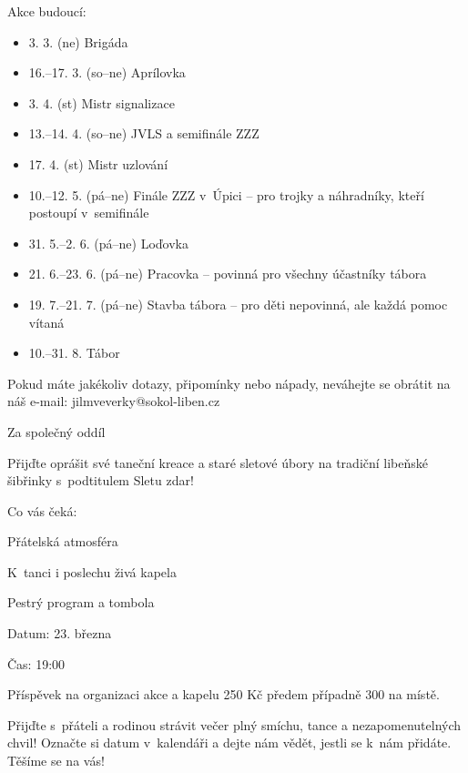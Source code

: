 \documentclass[11pt]{article}
\begin{document}
\clearpage
\vspace*{6pt}
\noindent
Akce budoucí:
\begin{itemize}[
  itemsep=-3pt,
  leftmargin=2em,
  itemindent=-1em
]
  \item[] 3. 3. (ne) Brigáda
  \item[] 16.–17. 3. (so–ne) Aprílovka
  \item[] 3. 4. (st) Mistr signalizace
  \item[] 13.–14. 4. (so–ne) JVLS a semifinále ZZZ
  \item[] 17. 4. (st) Mistr uzlování
  \item[] 10.–12. 5. (pá–ne) Finále ZZZ v~Úpici – pro trojky a náhradníky, kteří postoupí v~semifinále
  \item[] 31. 5.–2. 6. (pá–ne) Loďovka
  \item[] 21. 6.–23. 6. (pá–ne) Pracovka – povinná pro všechny účastníky tábora
  \item[] 19. 7.–21. 7. (pá–ne) Stavba tábora – pro děti nepovinná, ale každá pomoc vítaná
  \item[] 10.–31. 8. Tábor
\end{itemize}

\noindent
Pokud máte jakékoliv dotazy, připomínky nebo nápady, neváhejte se obrátit na náš e-mail: jilmveverky@sokol-liben.cz

Za společný oddíl
 
\signature{Bára Jeníková}{}



Přijďte oprášit své taneční kreace a staré sletové úbory na tradiční libeňské šibřinky s~podtitulem Sletu zdar!

\noindent
Co vás čeká:

Přátelská atmosféra 

K~tanci i poslechu živá kapela 

Pestrý program a tombola

\noindent Datum: 23. března

\noindent Čas: 19:00 

Příspěvek na organizaci akce a kapelu 250 Kč předem případně 300 na místě.

Přijďte s~přáteli a rodinou strávit večer plný smíchu, tance a nezapomenutelných chvil! Označte si datum v~kalendáři a dejte nám vědět, jestli se k~nám přidáte. Těšíme se na vás!

\clearpage

\pagestyle{blank}
\end{document}
